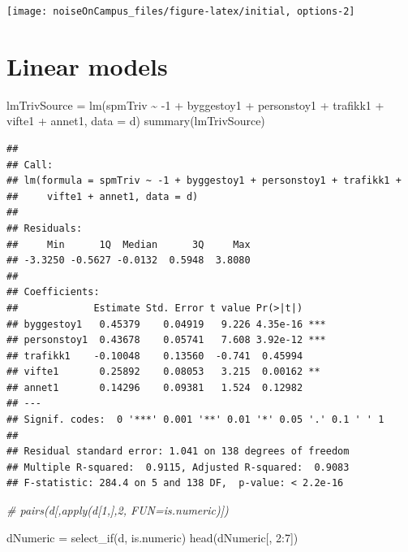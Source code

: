 \documentclass[
]{article}
\newenvironment{Shaded}{\begin{snugshade}}{\end{snugshade}}
\newcommand{\AttributeTok}[1]{\textcolor[rgb]{0.77,0.63,0.00}{#1}}
\newcommand{\CommentTok}[1]{\textcolor[rgb]{0.56,0.35,0.01}{\textit{#1}}}
\newcommand{\DecValTok}[1]{\textcolor[rgb]{0.00,0.00,0.81}{#1}}
\newcommand{\FunctionTok}[1]{\textcolor[rgb]{0.00,0.00,0.00}{#1}}
\newcommand{\NormalTok}[1]{#1}
\newcommand{\OtherTok}[1]{\textcolor[rgb]{0.56,0.35,0.01}{#1}}
\newcommand{\SpecialCharTok}[1]{\textcolor[rgb]{0.00,0.00,0.00}{#1}}
\begin{document}
\begin{center}\texttt{[image: noiseOnCampus\_files/figure-latex/initial, options-2]} \end{center}

\hypertarget{linear-models}{%
\section{Linear models}\label{linear-models}}

\begin{Shaded}
\begin{Highlighting}[]
\NormalTok{lmTrivSource }\OtherTok{=} \FunctionTok{lm}\NormalTok{(spmTriv }\SpecialCharTok{\textasciitilde{}} \SpecialCharTok{{-}}\DecValTok{1} \SpecialCharTok{+}\NormalTok{ byggestoy1 }\SpecialCharTok{+}\NormalTok{ personstoy1 }\SpecialCharTok{+}\NormalTok{ trafikk1 }\SpecialCharTok{+}\NormalTok{ vifte1 }\SpecialCharTok{+}\NormalTok{ annet1,}
    \AttributeTok{data =}\NormalTok{ d)}
\FunctionTok{summary}\NormalTok{(lmTrivSource)}
\end{Highlighting}
\end{Shaded}

\begin{verbatim}
## 
## Call:
## lm(formula = spmTriv ~ -1 + byggestoy1 + personstoy1 + trafikk1 + 
##     vifte1 + annet1, data = d)
## 
## Residuals:
##     Min      1Q  Median      3Q     Max 
## -3.3250 -0.5627 -0.0132  0.5948  3.8080 
## 
## Coefficients:
##             Estimate Std. Error t value Pr(>|t|)    
## byggestoy1   0.45379    0.04919   9.226 4.35e-16 ***
## personstoy1  0.43678    0.05741   7.608 3.92e-12 ***
## trafikk1    -0.10048    0.13560  -0.741  0.45994    
## vifte1       0.25892    0.08053   3.215  0.00162 ** 
## annet1       0.14296    0.09381   1.524  0.12982    
## ---
## Signif. codes:  0 '***' 0.001 '**' 0.01 '*' 0.05 '.' 0.1 ' ' 1
## 
## Residual standard error: 1.041 on 138 degrees of freedom
## Multiple R-squared:  0.9115, Adjusted R-squared:  0.9083 
## F-statistic: 284.4 on 5 and 138 DF,  p-value: < 2.2e-16
\end{verbatim}

\begin{Shaded}
\begin{Highlighting}[]
\CommentTok{\# pairs(d[,apply(d[1,],2, FUN=is.numeric)])}
\end{Highlighting}
\end{Shaded}

\begin{Shaded}
\begin{Highlighting}[]
\NormalTok{dNumeric }\OtherTok{=} \FunctionTok{select\_if}\NormalTok{(d, is.numeric)}
\FunctionTok{head}\NormalTok{(dNumeric[, }\DecValTok{2}\SpecialCharTok{:}\DecValTok{7}\NormalTok{])}
\end{Highlighting}
\end{Shaded}
\end{document}
